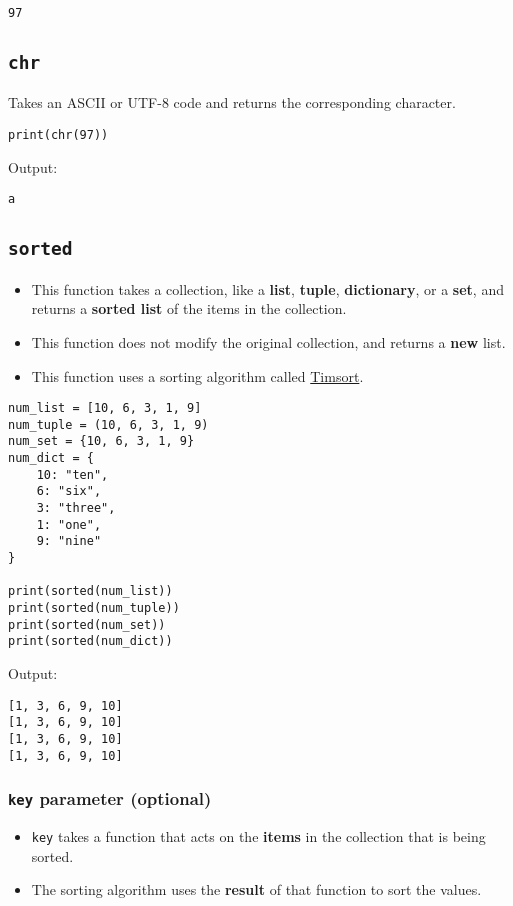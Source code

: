 \documentclass[11pt]{article}
\begin{document}
\label{org8c6337e}
\begin{verbatim}
97
\end{verbatim}
\subsection{\texttt{chr}}
\label{sec:org7aad734}
Takes an ASCII or UTF-8 code and returns the corresponding character.

\begin{verbatim}
print(chr(97))
\end{verbatim}

 \noindent Output:

\label{org4f6d4bb}
\begin{verbatim}
a
\end{verbatim}


 \newpage
\subsection{\texttt{sorted}}
\label{sec:org7397a60}
\begin{itemize}
\item This function takes a collection, like a \textbf{list}, \textbf{tuple}, \textbf{dictionary}, or a \textbf{set}, and returns a \textbf{sorted list} of the items in the collection.
\item This function does not modify the original collection, and returns a \textbf{new} list.
\item This function uses a sorting algorithm called \href{https://en.wikipedia.org/wiki/Timsort}{Timsort}.
\end{itemize}

\begin{verbatim}
num_list = [10, 6, 3, 1, 9]
num_tuple = (10, 6, 3, 1, 9)
num_set = {10, 6, 3, 1, 9}
num_dict = {
    10: "ten",
    6: "six",
    3: "three",
    1: "one",
    9: "nine"
}

print(sorted(num_list))
print(sorted(num_tuple))
print(sorted(num_set))
print(sorted(num_dict))
\end{verbatim}

 \noindent Output:

\label{org5f44246}
\begin{verbatim}
[1, 3, 6, 9, 10]
[1, 3, 6, 9, 10]
[1, 3, 6, 9, 10]
[1, 3, 6, 9, 10]
\end{verbatim}


 \newpage
\subsubsection{\texttt{key} parameter (optional)}
\label{sec:org467177f}
\begin{itemize}
\item \texttt{key} takes a function that acts on the \textbf{items} in the collection that is being sorted.
\item The sorting algorithm uses the \textbf{result} of that function to sort the values.
\end{itemize}
\end{document}

